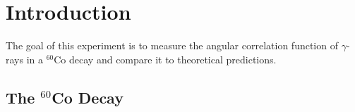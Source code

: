 \documentclass[a4paper,parskip,11pt, DIV12]{scrreprt}
\begin{document}
	\fancyfoot{}
	\fancyfoot[R]{\small \thepage}
	\fancyfoot[L]{}
	\fancyfoot[C]{}
	\renewcommand{\footrulewidth}{0.4pt} 
	
	\addtolength{\headheight}{2\baselineskip}
	\addtolength{\headheight}{0.6pt}
	
	
	\renewcommand{\headrulewidth}{0.6pt}
	\renewcommand{\footrulewidth}{0.4pt}
	
	\renewcommand{\chaptermark}[1]{ \markboth{#1}{} } %
	
	
	\tableofcontents
	
\chapter{Introduction}

		The goal of this experiment is to measure the angular correlation function of $\gamma$-rays in a $^{60}$Co decay and compare it to theoretical predictions.

\section{The $^{60}$Co Decay}
\end{document}
